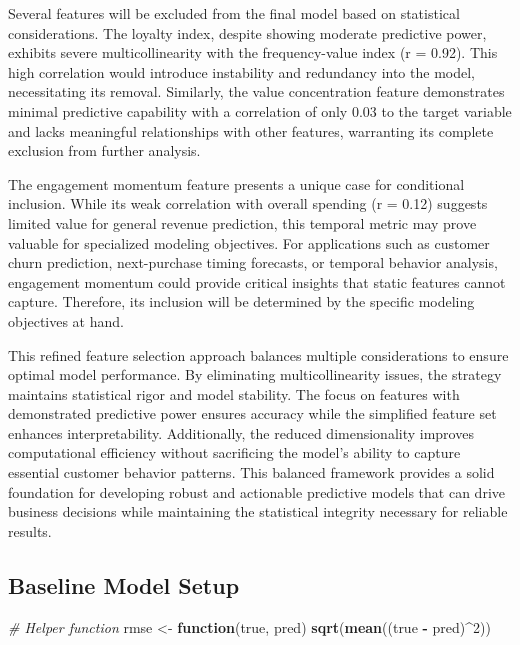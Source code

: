 \documentclass[
]{article}
\newenvironment{Shaded}{\begin{snugshade}}{\end{snugshade}}
\newcommand{\CommentTok}[1]{\textcolor[rgb]{0.56,0.35,0.01}{\textit{#1}}}
\newcommand{\ControlFlowTok}[1]{\textcolor[rgb]{0.13,0.29,0.53}{\textbf{#1}}}
\newcommand{\DecValTok}[1]{\textcolor[rgb]{0.00,0.00,0.81}{#1}}
\newcommand{\FunctionTok}[1]{\textcolor[rgb]{0.13,0.29,0.53}{\textbf{#1}}}
\newcommand{\NormalTok}[1]{#1}
\newcommand{\OtherTok}[1]{\textcolor[rgb]{0.56,0.35,0.01}{#1}}
\newcommand{\SpecialCharTok}[1]{\textcolor[rgb]{0.81,0.36,0.00}{\textbf{#1}}}
\begin{document}
Several features will be excluded from the final model based on
statistical considerations. The loyalty index, despite showing moderate
predictive power, exhibits severe multicollinearity with the
frequency-value index (r = 0.92). This high correlation would introduce
instability and redundancy into the model, necessitating its removal.
Similarly, the value concentration feature demonstrates minimal
predictive capability with a correlation of only 0.03 to the target
variable and lacks meaningful relationships with other features,
warranting its complete exclusion from further analysis.

The engagement momentum feature presents a unique case for conditional
inclusion. While its weak correlation with overall spending (r = 0.12)
suggests limited value for general revenue prediction, this temporal
metric may prove valuable for specialized modeling objectives. For
applications such as customer churn prediction, next-purchase timing
forecasts, or temporal behavior analysis, engagement momentum could
provide critical insights that static features cannot capture.
Therefore, its inclusion will be determined by the specific modeling
objectives at hand.

This refined feature selection approach balances multiple considerations
to ensure optimal model performance. By eliminating multicollinearity
issues, the strategy maintains statistical rigor and model stability.
The focus on features with demonstrated predictive power ensures
accuracy while the simplified feature set enhances interpretability.
Additionally, the reduced dimensionality improves computational
efficiency without sacrificing the model's ability to capture essential
customer behavior patterns. This balanced framework provides a solid
foundation for developing robust and actionable predictive models that
can drive business decisions while maintaining the statistical integrity
necessary for reliable results.

\subsection{Baseline Model Setup}\label{baseline-model-setup}

\begin{Shaded}
\begin{Highlighting}[]
\CommentTok{\# Helper function}
\NormalTok{rmse }\OtherTok{\textless{}{-}} \ControlFlowTok{function}\NormalTok{(true, pred) }\FunctionTok{sqrt}\NormalTok{(}\FunctionTok{mean}\NormalTok{((true }\SpecialCharTok{{-}}\NormalTok{ pred)}\SpecialCharTok{\^{}}\DecValTok{2}\NormalTok{))}
\end{Highlighting}
\end{Shaded}
\end{document}
